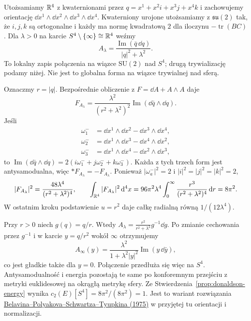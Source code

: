 \begin{przyklad}
\label{prz:donaldson-bpst}
Utożsamiamy $\mathbb{R}^4$ z kwaternionami przez
$q=x^1+x^2i+x^3j+x^4k$ i zachowujemy orientację
$\dd x^1\wedge\dd x^2\wedge\dd x^3\wedge\dd x^4$.
Kwaterniony urojone utożsamiamy z $\mathfrak{su}(2)$
tak, że $i,j,k$ są ortogonalne i każdy ma normę
kwadratową $2$ dla iloczynu $-\operatorname{tr}(BC)$.
Dla $\lambda>0$ na karcie
$S^4\setminus\{\infty\}\cong\mathbb{R}^4$ weźmy
\begin{equation}\label{eq:donaldson-bpst}
 A_\lambda=
 \frac{\operatorname{Im}(\bar q\,\dd q)}{|q|^2+\lambda^2}.
\end{equation}
To lokalny zapis połączenia na wiązce $\mathrm{SU}(2)$
nad $S^4$; drugą trywializację podamy niżej. Nie jest
to globalna forma na wiązce trywialnej nad sferą.

Oznaczmy $r=|q|$. Bezpośrednie obliczenie z
$F=\dd A+A\wedge A$ daje
\[
 F_{A_\lambda}=
 \frac{\lambda^2}{(r^2+\lambda^2)^2}
 \operatorname{Im}(\dd\bar q\wedge\dd q).
\]
Jeśli
\[
 \begin{aligned}
 \omega_1^-&=\dd x^1\wedge\dd x^2-\dd x^3\wedge\dd x^4,\\
 \omega_2^-&=\dd x^1\wedge\dd x^3-\dd x^4\wedge\dd x^2,\\
 \omega_3^-&=\dd x^1\wedge\dd x^4-\dd x^2\wedge\dd x^3,
 \end{aligned}
\]
to $\operatorname{Im}(\dd\bar q\wedge\dd q)
=2(i\omega_1^-+j\omega_2^-+k\omega_3^-)$.
Każda z tych trzech form jest antysamodualna,
więc $*F_{A_\lambda}=-F_{A_\lambda}$.
Ponieważ $|\omega_a^-|^2=2$ i $|i|^2=|j|^2=|k|^2=2$,
\[
 |F_{A_\lambda}|^2
 =\frac{48\lambda^4}{(r^2+\lambda^2)^4},\qquad
 \int_{\mathbb{R}^4}|F_{A_\lambda}|^2\,\mathrm d^4x
 =96\pi^2\lambda^4
   \int_0^\infty\frac{r^3}{(r^2+\lambda^2)^4}\,\mathrm d r
 =8\pi^2.
\]
W ostatnim kroku podstawienie $u=r^2$ daje całkę
radialną równą $1/(12\lambda^4)$.

Przy $r>0$ niech $g(q)=q/r$. Wtedy
$A_\lambda=\frac{r^2}{r^2+\lambda^2}g^{-1}\dd g$.
Po zmianie cechowania przez $g^{-1}$ i w karcie
$y=q/r^2$ wokół $\infty$ otrzymujemy
\[
 A_\infty(y)=
 \frac{\lambda^2}{1+\lambda^2|y|^2}
 \operatorname{Im}(y\,\dd\bar y),
\]
co jest gładkie także dla $y=0$. Połączenie przedłuża
się więc na $S^4$. Antysamodualność i energia pozostają
te same po konforemnym przejściu z metryki euklidesowej
na okrągłą metrykę sfery. Ze
Stwierdzenia~\ref{prop:donaldson-energy} wynika
$c_2(E)[S^4]=8\pi^2/(8\pi^2)=1$.
Jest to wariant rozwiązania
\href{https://strings.itp.ac.ru/Papers/belavin1975.pdf}
{Belavina--Polyakova--Schwartza--Tyupkina (1975)}
w przyjętej tu orientacji i normalizacji.
\end{przyklad}

